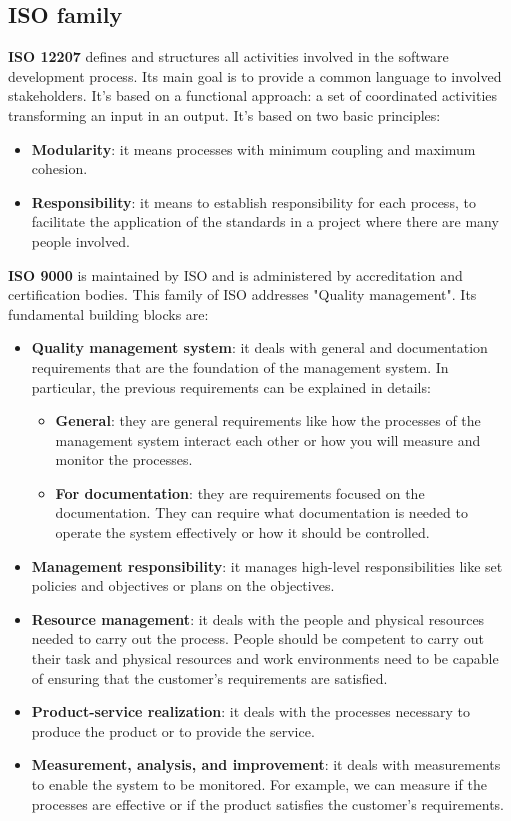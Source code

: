 \subsection{ISO family}
\textbf{ISO 12207} defines and structures all activities involved in the software development process. Its main goal is to provide a common language to involved stakeholders.
It's based on a functional approach: a set of coordinated activities transforming an input in an output. It's based on two basic principles:
\begin{itemize}
      \item \textbf{Modularity}: it means processes with minimum coupling and maximum cohesion.
      \item \textbf{Responsibility}: it means to establish responsibility for each process, to facilitate the application of the standards in a project where there are many people involved.
\end{itemize}
\textbf{ISO 9000} is maintained by ISO and is administered by accreditation and certification bodies.
This family of ISO addresses "Quality management".
Its fundamental building blocks are:
\begin{itemize}
      \item \textbf{Quality management system}: it deals with general and documentation requirements that are the foundation of the management system.
            In particular, the previous requirements can be explained in details:
            \begin{itemize}
                  \item \textbf{General}: they are general requirements like how the processes of the management system interact each other or how you will measure and monitor the processes.
                  \item \textbf{For documentation}: they are requirements focused on the documentation.
                        They can require what documentation is needed to operate the system effectively or how it should be controlled.
            \end{itemize}
      \item \textbf{Management responsibility}: it manages high-level responsibilities like set policies and objectives or plans on the objectives.
      \item \textbf{Resource management}: it deals with the people and physical resources needed to carry out the process. People should be competent to carry out their task and physical resources and work environments need to be capable of ensuring that the customer's requirements are satisfied.
      \item \textbf{Product-service realization}: it deals with the processes necessary to produce the product or to provide the service.
      \item \textbf{Measurement, analysis, and improvement}: it deals with measurements to enable the system to be monitored.
            For example, we can measure if the processes are effective or if the product satisfies the customer's requirements.
\end{itemize}
